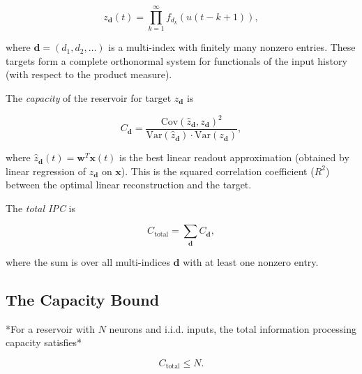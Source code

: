 \[
z_{\mathbf{d}}(t) = \prod_{k=1}^{\infty} f_{d_k}(u(t-k+1)),
\]

where $\mathbf{d} = (d_1, d_2, \ldots)$ is a multi-index with finitely many nonzero
entries. These targets form a complete orthonormal system for functionals of the input
history (with respect to the product measure).

\begin{definition}\label{def:15.16}
The \textit{capacity} of the reservoir for
target $z_{\mathbf{d}}$ is

\[
C_{\mathbf{d}} = \frac{\text{Cov}(\hat{z}_{\mathbf{d}}, z_{\mathbf{d}})^2}{\text{Var}(\hat{z}_{\mathbf{d}}) \cdot \text{Var}(z_{\mathbf{d}})},
\]

where $\hat{z}_{\mathbf{d}}(t) = \mathbf{w}^T \mathbf{x}(t)$ is the best linear readout
approximation (obtained by linear regression of $z_{\mathbf{d}}$ on $\mathbf{x}$).
This is the squared correlation coefficient ($R^2$) between the optimal linear
reconstruction and the target.
\end{definition}


\begin{definition}\label{def:15.17}
The \textit{total IPC} is

\[
C_{\text{total}} = \sum_{\mathbf{d}} C_{\mathbf{d}},
\]

where the sum is over all multi-indices $\mathbf{d}$ with at least one nonzero entry.
\end{definition}


\subsection{The Capacity Bound}\label{sec:15.6.2}

\begin{theorem}[Dambre et al. 2012]\label{thm:15.18}
*For a reservoir with $N$ neurons and i.i.d.
inputs, the total information processing capacity satisfies*

\[
C_{\text{total}} \leq N.
\]
\end{theorem}


